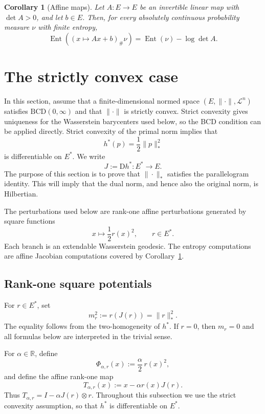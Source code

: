 \documentclass[10pt,a4paper]{amsart}
\numberwithin{equation}{section}
\newtheorem{corollary}[theorem]{Corollary}
\newcommand{\R}{\mathbb{R}}
\newcommand{\Ent}{\operatorname{Ent}}
\newcommand{\D}{\mathrm D}
\begin{document}
	\begin{corollary}[Affine maps]
		\label{cor:affine-entropy}
		Let \(A:E\to E\) be an invertible linear map with \(\det A>0\), and let \(b\in E\). Then, for every absolutely continuous probability measure \(\nu\) with finite entropy,
		\[
		\Ent((x\mapsto Ax+b)_\#\nu)
		=\Ent(\nu)-\log\det A.
		\]
	\end{corollary}
	
	
	
	
	
	\section{The strictly convex case}\label{sec:strict-case}
	
	In this section, assume that a finite-dimensional normed space \((E,\|\cdot\|,\mathcal L^n)\) satisfies \(\mathrm{BCD}(0,\infty)\) and that $\|\cdot\|$ is strictly convex. Strict convexity gives uniqueness for the Wasserstein barycenters used below, so the BCD condition can be applied directly.
	Strict convexity of the primal norm implies that
	\[
	h^*(p)=\frac12\|p\|_*^2
	\]
	is differentiable on \(E^*\). We write
	\[
	J:=\D h^*:E^*\to E.
	\]
	The purpose of this section is to prove that \(\|\cdot\|_*\) satisfies the parallelogram
	identity. This will imply that the dual norm, and hence also the original norm, is
	Hilbertian.
	
	The perturbations used below are rank-one affine perturbations generated by square functions
	\[
	x\longmapsto \frac12 r(x)^2,
	\qquad r\in E^*.
	\]
	Each branch is an extendable Wasserstein geodesic. The entropy computations are affine Jacobian computations covered by Corollary~\ref{cor:affine-entropy}.
	
	\subsection{Rank-one square potentials}\label{subsec:rank-one-square-potentials}
	
	For \(r\in E^*\), set
	\[
	m_r^2:=r(J(r))=\|r\|_*^2.
	\]
	The equality follows from the two-homogeneity of \(h^*\). If \(r=0\), then
	\(m_r=0\) and all formulas below are interpreted in the trivial sense.
	
	For \(\alpha\in\R\), define
	\[
	\Phi_{\alpha,r}(x):=\frac{\alpha}{2}\,r(x)^2,
	\]
	and define the affine rank-one map
	\[
	T_{\alpha,r}(x):=x-\alpha r(x)J(r).
	\]
	Thus \(T_{\alpha,r}=I-\alpha J(r)\otimes r\).
	Throughout this subsection we use the strict convexity assumption, so that
	\(h^*\) is differentiable on \(E^*\). 
	
\end{document}
